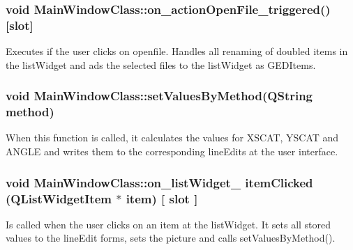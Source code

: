 \subsubsection{ void MainWindowClass::on\_actionOpenFile\_triggered()  [slot] }
Executes if the user clicks on openfile. Handles all renaming of doubled items in the listWidget and ads the selected files to the listWidget as GEDItems. 

\subsubsection{void MainWindowClass::setValuesByMethod(QString method) }
When this function is called, it calculates the values for XSCAT, YSCAT and ANGLE and writes them to the corresponding lineEdits at the user interface.  

\subsubsection{void MainWindowClass::on\_listWidget\_ itemClicked (QListWidgetItem  $\ast$ item) [ slot ] }
Is called when the user clicks on an item at the listWidget. It sets all stored values to the lineEdit forms, sets the picture and calls  setValuesByMethod(). 
